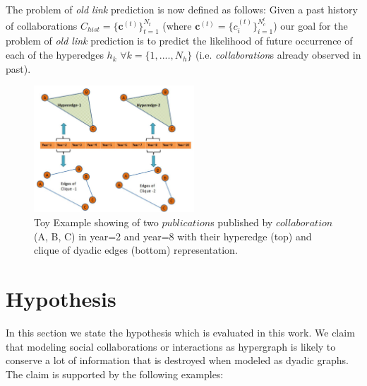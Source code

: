 \documentclass{sig-alternate}
\begin{document}
The problem of \textit{old link} prediction is now defined as follows: Given a past history of collaborations $C_{hist}=\{\mathbf{c}^{(t)}\}_{t=1}^{N_t}$ (where $\mathbf{c}^{(t)} = \{c_i^{(t)}\}_{i=1}^{N_c^{t}}$) our goal for the problem of \textit{old link} prediction is to predict the likelihood of future occurrence of each of the hyperedges $h_k$ $\forall k=\{1,....,N_h\}$ (i.e. \textit{collaboration}s already observed in past).

\begin{figure}[h!]
\centering
\includegraphics[width=60mm]{intuition.JPG}
\caption{Toy Example showing of two $publication$s published by $collaboration$ (A, B, C) in year=2 and year=8 with their hyperedge (top) and clique of dyadic edges (bottom) representation.}
\label{overflow}
\vspace{-1.7em}
\end{figure}

\section{Hypothesis}

In this section we state the hypothesis which is evaluated in this work. We claim that modeling social collaborations or interactions as hypergraph is likely to conserve a lot of information that is destroyed when modeled as dyadic graphs. The claim is supported by the following examples:
\end{document}
